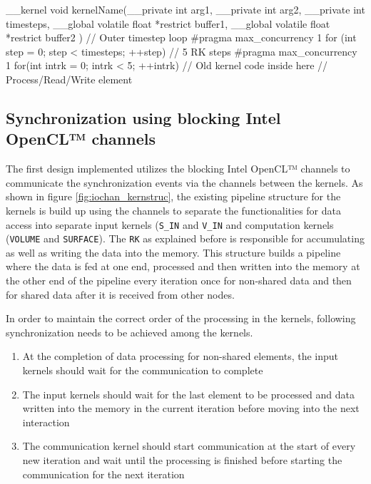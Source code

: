 \begin{CppCode}[caption=Pseudo-code of kernel showing additional timestep loops added for creating FPGA only design, frame=tlrb, label=code:timestep]
__kernel void kernelName(__private int arg1,
                         __private int arg2,
                         __private int timesteps,
                         __global volatile float  *restrict buffer1,
                         __global volatile float  *restrict buffer2
                        )
{
    // Outer timestep loop
    #pragma max_concurrency 1
    for (int step = 0; step < timesteps; ++step)
    {
        // 5 RK steps
        #pragma max_concurrency 1
        for(int intrk = 0; intrk < 5; ++intrk)
        {
            // Old kernel code inside here
            // Process/Read/Write element
        }
    }
}
\end{CppCode}

\subsection{Synchronization using blocking Intel OpenCL™ channels}
\label{sec:sync_iochan}

The first design implemented utilizes the blocking Intel OpenCL™ channels
to communicate the synchronization events via the channels between the kernels.
As shown in figure \ref{fig:iochan_kernstruc}, the existing pipeline
structure for the kernels is build up using the channels to separate the functionalities
for data access into separate input kernels (\texttt{S\_IN} and \texttt{V\_IN}
and computation kernels (\texttt{VOLUME} and \texttt{SURFACE}). The \texttt{RK}
as explained before is responsible for accumulating as well as writing the data into
the memory. This structure builds a pipeline where the data is fed at one end,
processed and then written into the memory at the other end of the pipeline every
iteration once for non-shared data and then for shared data after it is received
from other nodes.

In order to maintain the correct order of the processing in the kernels,
following synchronization needs to be achieved among the kernels.

\begin{enumerate}
    \item At the completion of data processing for non-shared elements, the input kernels should wait
    for the communication to complete
    \item The input kernels should wait for the last element to be processed and data written into the memory
    in the current iteration before moving into the next interaction
    \item The communication kernel should start communication at the start of every new iteration and wait
    until the processing is finished before starting the communication for the next iteration
\end{enumerate}

